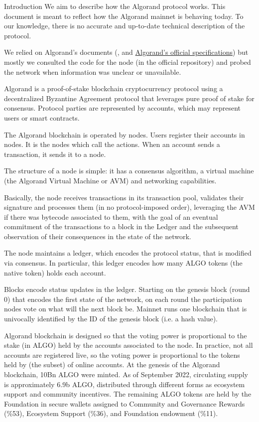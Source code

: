 \documentclass[10pt,a4paper]{article}
\begin{document}
\begin{section}{Introduction}
We aim to describe how the Algorand protocol works. 
This document is meant to reflect how the Algorand mainnet is behaving
today. 
To our knowledge, there is no accurate and up-to-date technical description 
of the protocol. 

We relied on Algorand's documents (\cite{DBLP:conf/sosp/GiladHMVZ17},
\cite{DBLP:journals/corr/Micali16} and
\href{https://github.com/algorandfoundation/specs}{Algorand's official specifications})
but mostly we consulted the code for the node (in the official repository) and probed 
the network when information was unclear or unavailable.

Algorand is a proof-of-stake blockchain cryptocurrency protocol 
using a decentralized By\-zan\-tine Agreement protocol that leverages 
pure proof of stake for consensus. 
Protocol parties are represented by accounts, which may represent users
or smart contracts. 

The Algorand blockchain is operated by nodes. Users register their accounts 
in nodes. It is the nodes which call the actions. 
When an account sends a transaction, it sends it to a node. 

The structure of a node is simple: 
it has a consensus algorithm,
a virtual machine (the Algorand Virtual Machine or AVM) and networking
capabilities.

Basically, the node receives transactions in its transaction pool,
validates their signature and processes them (in no protocol-imposed order), leveraging the
AVM if there was bytecode associated to them, with the goal of an eventual commitment of the transactions
to a block in the Ledger and the subsequent observation of their consequences in the state of the network.

The node maintains a ledger, which encodes the protocol status,
that is modified via consensus.
In particular, this ledger encodes how many {\sf ALGO tokens} 
(the native token) holds each account.

Blocks encode status updates in the ledger. Starting on the genesis
block (round 0) that encodes the first state of the network, 
on each round the participation nodes vote on what will the next
block be. 
Mainnet runs one blockchain that is univocally identified by the ID of
the genesis block (i.e. a hash value).

Algorand blockchain is designed so that the voting power is proportional
to the stake (in {\sf ALGO}) held by the accounts associated to the node.
In practice, not all accounts are registered live, so the voting power
is proportional to the tokens held by (the subset) of online accounts.
At the genesis of the Algorand blockchain, 10Bn {\sf ALGO} were minted. 
As of September 2022, circulating supply is approximately 6.9b {\sf ALGO}, 
distributed through different forms as ecosystem support and community
incentives.
The remaining {\sf ALGO} tokens are held by the Foundation in secure wallets 
assigned to 
Community and Governance Rewards (\%53), 
Ecosystem Support (\%36), and 
Foundation endowment (\%11).


\end{section}
\end{document}
